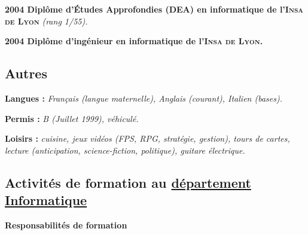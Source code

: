 \documentclass[12pt,a4paper]{article}
\newcommand{\activite}[1]{\textbf{#1}\xspace}
\newcommand{\comment}[1]{\textsl{#1}\xspace}
\newcommand{\INSAL}{\textsc{Insa de Lyon}\xspace}
\begin{document}
   \activite{2004 Diplôme d'Études Approfondies (DEA) en informatique de l'\INSAL}
    \comment{(rang 1\ier/55).}

    \activite{2004 Diplôme d'ingénieur en informatique de l'\INSAL.}

\subsection*{Autres}

  \activite{Langues :}
  \comment{Français (langue maternelle), Anglais (courant), Italien (bases).}

  \activite{Permis :}
  \comment{B (Juillet 1999), véhiculé.}

  \activite{Loisirs :}
  \comment{cuisine, jeux vidéos (FPS, RPG, stratégie, gestion), tours de cartes, lecture (anticipation, science-fiction, politique), guitare électrique.}

\clearpage

\subsection*{Activités de formation au \href{https://fst-informatique.univ-lyon1.fr/}{département Informatique}}

\activite{Responsabilités de formation}
\end{document}
